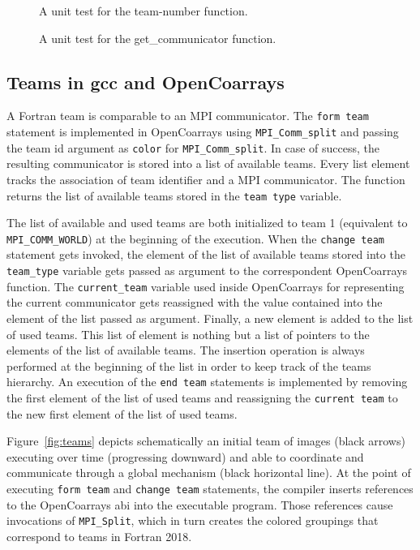 \begin{figure}
  
  \vspace{-12pt}
  \caption{A unit test for the team-number function.\label{fig:team-number-test}}
\end{figure}

\begin{figure}
  
  \vspace{-12pt}
  \caption{A unit test for the get\_communicator function.\label{fig:get-communicator-test}}
\end{figure}

\subsection{Teams in \gls{gcc} and OpenCoarrays}\label{subsec:teams-in-gcc}
A Fortran team is comparable to an MPI communicator. The \texttt{form team} statement is implemented in OpenCoarrays
using \texttt{MPI\_Comm\_split} and passing the team id argument as \texttt{color} for \texttt{MPI\_Comm\_split}.
In case of success, the resulting communicator is stored into a list of available teams.
Every list element tracks the association of team identifier and a MPI communicator.
The function returns the list of available teams stored in the \texttt{team type} variable.

The list of available and used teams are both initialized to team 1 (equivalent to \texttt{MPI\_COMM\_WORLD}) at the beginning of the execution.
When the \texttt{change team} statement gets invoked, the element of the list of available teams stored into the \texttt{team\_type} variable
gets passed as argument to the correspondent OpenCoarrays function. The \texttt{current\_team} variable used inside OpenCoarrays for
representing the current communicator gets reassigned with the value contained into the element of the list passed as argument.
Finally, a new element is added to the list of used teams. This list of element is nothing but a list of pointers to the elements of the list
of available teams. The insertion operation is always performed at the beginning of the list in order to keep track of the teams hierarchy.
An execution of the \texttt{end team} statements is implemented by removing the first element of the list of used teams and reassigning the
\texttt{current team} to the new first element of the list of used teams.

Figure~\ref{fig:teams} depicts schematically an initial team of images (black arrows) executing over time (progressing
downward) and able to coordinate and communicate through a global mechanism (black horizontal line).  At the point of executing
\texttt{form team} and \texttt{change team} statements, the compiler inserts references to the OpenCoarrays \gls{abi} into the
executable program.  Those references cause invocations of \texttt{MPI\_Split}, which in turn creates the colored groupings that
correspond to teams in Fortran 2018.


